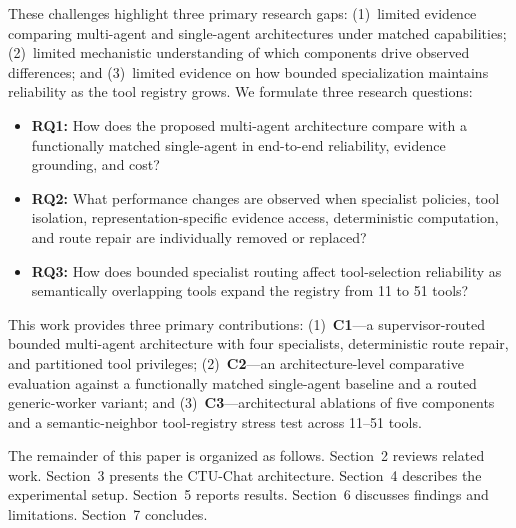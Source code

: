These challenges highlight three primary research gaps: (1)~limited evidence comparing multi-agent and single-agent architectures under matched capabilities; (2)~limited mechanistic understanding of which components drive observed differences; and (3)~limited evidence on how bounded specialization maintains reliability as the tool registry grows. We formulate three research questions:
\begin{itemize}
    \setlength{\itemsep}{1.5pt}
    \setlength{\parsep}{0pt}
    \setlength{\parskip}{0pt}
    \item \textbf{RQ1:} How does the proposed multi-agent architecture compare with a functionally matched single-agent in end-to-end reliability, evidence grounding, and cost?
    \item \textbf{RQ2:} What performance changes are observed when specialist policies, tool isolation, representation-specific evidence access, deterministic computation, and route repair are individually removed or replaced?
    \item \textbf{RQ3:} How does bounded specialist routing affect tool-selection reliability as semantically overlapping tools expand the registry from 11 to 51 tools?
\end{itemize}

This work provides three primary contributions:
(1)~\textbf{C1}---a supervisor-\allowbreak routed bounded multi-agent architecture with four specialists, deterministic route repair, and partitioned tool privileges;
(2)~\textbf{C2}---an architecture-level comparative evaluation against a functionally matched single-agent baseline and a routed generic-worker variant; and
(3)~\textbf{C3}---architectural ablations of five components and a semantic-neighbor tool-registry stress test across 11--51 tools.

The remainder of this paper is organized as follows. Section~2 reviews related work. Section~3 presents the CTU-Chat architecture. Section~4 describes the experimental setup. Section~5 reports results. Section~6 discusses findings and limitations. Section~7 concludes.

